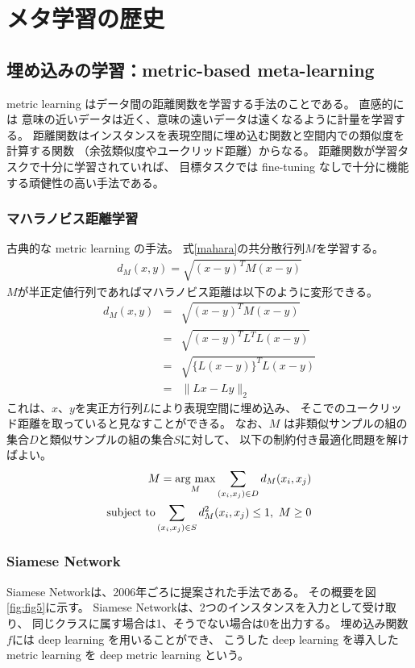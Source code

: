 \documentclass{jsarticle}
\newcommand{\argmax}{\mathop{\rm arg~max}\limits}
\begin{document}

\section{メタ学習の歴史}
\subsection{埋め込みの学習：metric-based meta-learning}
metric learning はデータ間の距離関数を学習する手法のことである。
直感的には
意味の近いデータは近く、意味の遠いデータは遠くなるように計量を学習する\cite{MetricLe5:online}。
距離関数はインスタンスを表現空間に埋め込む関数と空間内での類似度を計算する関数
（余弦類似度やユークリッド距離）からなる。
距離関数が学習タスクで十分に学習されていれば、
目標タスクでは fine-tuning なしで十分に機能する頑健性の高い手法である。

\subsubsection{マハラノビス距離学習}
古典的な metric learning の手法\cite{MetricLe5:online}。
式\ref{mahara}の共分散行列$M$を学習する。
\begin{eqnarray}
  \label{mahara}
  d_M(x,y) = \sqrt{(x-y)^TM(x-y)}
\end{eqnarray}
$M$が半正定値行列であればマハラノビス距離は以下のように変形できる。
\begin{eqnarray}
  \label{mahara2}
  d_M(x,y) 
  &=& \sqrt{(x-y)^TM(x-y)} \nonumber\\
  &=& \sqrt{(x-y)^TL^TL(x-y)} \nonumber\\
  &=& \sqrt{\{L(x-y)\}^TL(x-y)} \nonumber\\
  &=& \|Lx-Ly\|_2
\end{eqnarray}
これは、$x$、$y$を実正方行列$L$により表現空間に埋め込み、
そこでのユークリッド距離を取っていると見なすことができる。
なお、$M$ は非類似サンプルの組の集合$D$と類似サンプルの組の集合$S$に対して、
以下の制約付き最適化問題を解けばよい。
\begin{eqnarray}
  \label{mahara3}
  M = \argmax_M \sum_{(x_i,x_j)\in D} d_M(x_i, x_j) \nonumber\\
  {\rm subject\ to }   \sum_{(x_i,x_j)\in S} d^2_M(x_i, x_j) \le 1,\ M \ge 0
\end{eqnarray}


\subsubsection{Siamese Network}
Siamese Networkは、2006年ごろに提案された手法である。
その概要を図\ref{fig:fig5}に示す。
Siamese Networkは、2つのインスタンスを入力として受け取り、
同じクラスに属す場合は1、そうでない場合は0を出力する。
埋め込み関数$f$には deep learning を用いることができ、
こうした deep learning を導入した metric learning を deep metric learning という。
\end{document}
